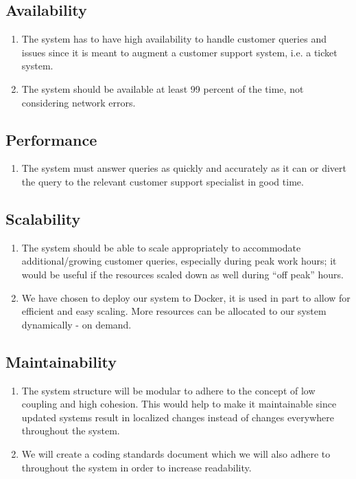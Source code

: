 \documentclass[11pt]{article}
\begin{document}
\subsection{Availability}
\begin{enumerate}
    \item The system has to have high availability to handle customer queries and issues since it is meant to augment a customer support system, i.e. a ticket system.
    \item The system should be available at least 99 percent of the time, not considering network errors.
\end{enumerate}

\subsection{Performance}
\begin{enumerate}
    \item The system must answer queries as quickly and accurately as it can or divert the query to the relevant customer support specialist in good time. 
\end{enumerate}

\subsection{Scalability}
\begin{enumerate}
    \item The system should be able to scale appropriately to accommodate additional/growing customer queries, especially during peak work hours; it would be useful if the resources scaled down as well during “off peak” hours.
    \item We have chosen to deploy our system to Docker, it is used in part to allow for efficient and easy scaling. More resources can be allocated to our system dynamically - on demand.
\end{enumerate}

\subsection{Maintainability}
\begin{enumerate}
    \item The system structure will be modular to adhere to the concept of low coupling and high cohesion. This would help to make it maintainable since updated systems result in localized changes instead of changes everywhere throughout the system.
    \item We will create a coding standards document which we will also adhere to throughout the system in order to increase readability.
\end{enumerate}
\end{document}
